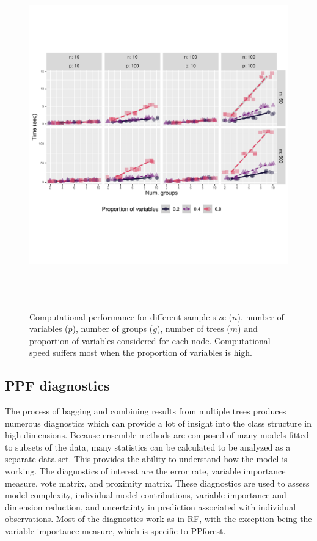 \documentclass[12pt]{article}\usepackage[]{graphicx}\usepackage[]{color}
\newenvironment{knitrout}{}{} %
\begin{document}
\begin{figure}[!ht]
\begin{knitrout}
\color{fgcolor}
\includegraphics[width=15cm,height=15cm]{figure/resus-1} 

\end{knitrout}
\vspace{-3cm}
\caption{Computational performance for different sample size ($n$), number of variables ($p$), number of groups ($g$), number of trees ($m$) and proportion of variables considered for each node. Computational speed suffers most when the proportion of variables is high.\label{ratiotim}}
\end{figure}

\subsection{PPF diagnostics}

The process of bagging and combining results from multiple trees produces numerous diagnostics which can provide a lot of insight into the class structure in high dimensions. Because ensemble methods are composed of many models fitted to subsets of the data, many statistics can be calculated to be analyzed as a separate data set. This provides the ability to understand how the model is working. The diagnostics of interest are the error rate, variable importance measure, vote matrix, and proximity matrix. 
These diagnostics are used to assess model complexity, individual model contributions, variable importance and dimension reduction, and uncertainty in prediction associated with individual observations. Most of the diagnostics work as in RF, with the exception being the variable importance measure, which is specific to PPforest.
\end{document}
